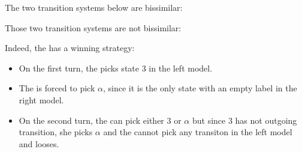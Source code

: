 \begin{example}
    The two transition systems below are bissimilar:
    \begin{center}
    \end{center}

    \begin{center}
    \end{center}
\end{example}

\begin{example}
    Those two transition systems are not bissimilar:
    \begin{center}
        \quad\quad
        \quad\quad
    \end{center}

    Indeed, the \Attacker has a winning strategy:
    \begin{itemize}
        \item On the first turn, the \Attacker picks state 3 in the left model.
        \item The \Defender is forced to pick $\alpha$, since it is the
            only state with an empty label in the right model.
        \item On the second turn, the \Attacker can pick either $3$ or $\alpha$
            but since 3 has not outgoing transition, she picks $\alpha$
            and the \Defender cannot pick any transiton in the left model
            and looses.
    \end{itemize}
\end{example}



